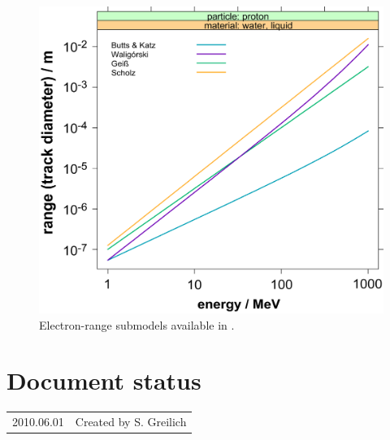 \begin{figure}
	\centering
		\includegraphics[bb=0 0 2211 1973,width=1.0\textwidth]{pictures/ER.png}
	\caption{Electron-range submodels available in \la{}.}
	\label{fig:ERs}
\end{figure}


\section*{Document status}
\begin{tabular}{l l}
2010.06.01&Created by S. Greilich
\end{tabular}